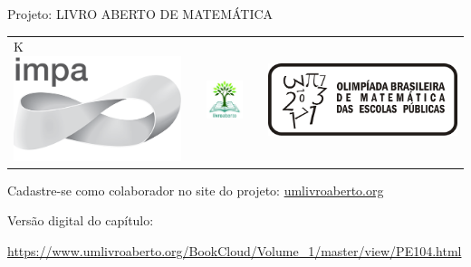 \begin{center}
Projeto: LIVRO ABERTO DE MATEMÁTICA

\noindent \begin{tabular}{lcccr}K
\includegraphics[scale=.15]{impa}& \quad\quad& \includegraphics[width=3cm]{logo} & \quad\quad& \includegraphics[scale=.24]{obmep} 
\end{tabular}
\end{center}

\vspace*{.3cm}

Cadastre-se como colaborador no site do projeto: \url{umlivroaberto.org}

Versão digital do capítulo:

\url{https://www.umlivroaberto.org/BookCloud/Volume_1/master/view/PE104.html}


